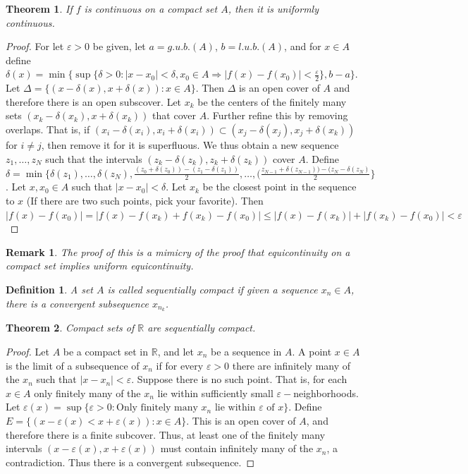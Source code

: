 \documentclass[oneside]{book}
\theoremstyle{mystyle}
\newtheorem{theorem}{Theorem}[section]
\newtheorem{definition}{Definition}[section]
\newtheorem{remark}{Remark}[section]
\begin{document}
\begin{theorem}
If $f$ is continuous on a compact set $A$, then it is uniformly continuous.
\end{theorem}
\begin{proof}
For let $\varepsilon>0$ be given, let $a=g.u.b.(A)$, $b=l.u.b.(A)$, and for $x\in A$ define $\delta(x) = \min\{\sup\{\delta>0: |x-x_0|<\delta,x_0\in A\Rightarrow |f(x)-f(x_0)|<\frac{\varepsilon}{2}\},b-a\}$. Let $\Delta = \{(x-\delta(x),x+\delta(x)):x\in A\}$. Then $\Delta$ is an open cover of $A$ and therefore there is an open subscover. Let $x_k$ be the centers of the finitely many sets $(x_k-\delta(x_k),x+\delta(x_k))$ that cover $A$. Further refine this by removing overlaps. That is, if $(x_i-\delta(x_i),x_i+\delta(x_i))\subset (x_j-\delta(x_j),x_j+\delta(x_k))$ for $i\ne j$, then remove it for it is superfluous. We thus obtain a new sequence $z_1,\hdots, z_N$ such that the intervals $(z_k-\delta(z_k),z_k+\delta(z_k))$ cover $A$. Define $\delta = \min\{\delta(z_1),\hdots,\delta(z_N), \frac{(z_0+\delta(z_0))-(z_1-\delta(z_1))}{2},\hdots,(\frac{z_{N-1}+\delta(z_{N-1}))-(z_{N}-\delta(z_{N})}{2}\}$. Let $x,x_0\in A$ such that $|x-x_0|<\delta$. Let $x_k$ be the closest point in the sequence to $x$ (If there are two such points, pick your favorite). Then $|f(x)-f(x_0)|=|f(x)-f(x_k)+f(x_k)-f(x_0)|\leq |f(x)-f(x_k)|+|f(x_k)-f(x_0)|<\varepsilon$
\end{proof}

\begin{remark}
The proof of this is a mimicry of the proof that equicontinuity on a compact set implies uniform equicontinuity.
\end{remark}

\begin{definition}
A set $A$ is called sequentially compact if given a sequence $x_n\in A$, there is a convergent subsequence $x_{n_k}$.
\end{definition}

\begin{theorem}
Compact sets of $\mathbb{R}$ are sequentially compact.
\end{theorem}
\begin{proof}
Let $A$ be a compact set in $\mathbb{R}$, and let $x_n$ be a sequence in $A$. A point $x\in A$ is the limit of a subsequence of $x_n$ if for every $\varepsilon>0$ there are infinitely many of the $x_n$ such that $|x-x_n|<\varepsilon$. Suppose there is no such point. That is, for each $x\in A$ only finitely many of the $x_n$ lie within sufficiently small $\varepsilon-$neighborhoods. Let $\varepsilon(x) = \sup\{\varepsilon>0:\textrm{Only finitely many }x_n \textrm{ lie within } \varepsilon \textrm{ of } x\}$. Define $E=\{(x-\varepsilon(x)<x+\varepsilon(x)):x\in A\}$. This is an open cover of $A$, and therefore there is a finite subcover. Thus, at least one of the finitely many intervals $(x-\varepsilon(x),x+\varepsilon(x))$ must contain infinitely many of the $x_n$, a contradiction. Thus there is a convergent subsequence.
\end{proof}
\end{document}
